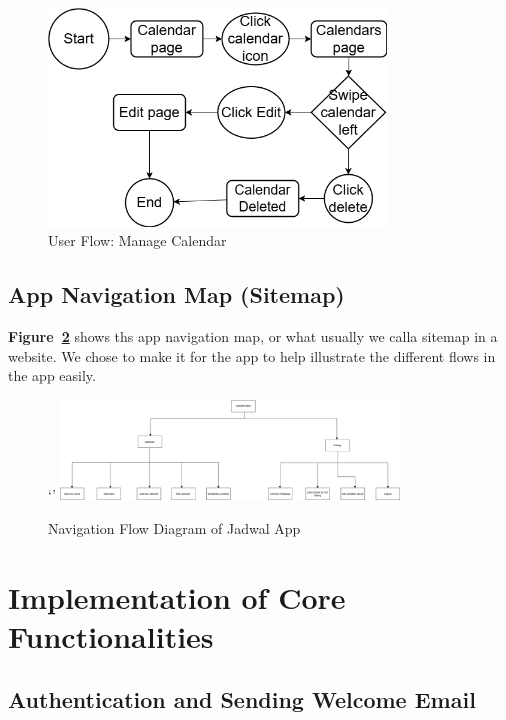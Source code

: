 \begin{figure}[H]
    \centering
    \includegraphics[width=0.8\textwidth]{images/Manage calendar.drawio.png}
    \caption{User Flow: Manage Calendar}
    \label{fig:userflow-manage-calendar}
\end{figure}

\subsection{App Navigation Map (Sitemap)}

\textbf{Figure~\ref{fig:sitemap}} shows ths app navigation map, or what usually we calla  sitemap in a website. We chose to make it for the app to help illustrate the different flows in the app easily.

\begin{figure}[H]`'
    \centering
    \includegraphics[width=0.8\textwidth]{images/JadwalSitemap.drawio.png}
    \caption{Navigation Flow Diagram of Jadwal App}
    \label{fig:sitemap}
\end{figure}

\section{Implementation of Core Functionalities}

\subsection{Authentication and Sending Welcome Email} \label{subsec:authentication}

